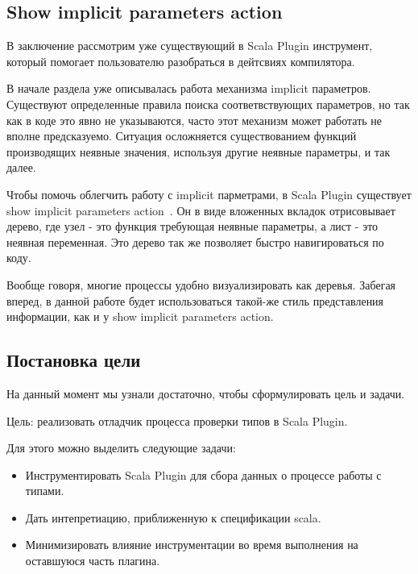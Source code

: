 
\subsection{Show implicit parameters action}
\label{sec:showImplicit}

В заключение рассмотрим уже существующий в Scala Plugin инструмент, который
помогает пользователю разобраться в дейтсвиях компилятора.

В начале раздела уже описывалась работа механизма implicit параметров.
Существуют определенные правила поиска соответвствующих параметров,
но так как в коде это явно не указываются, часто этот механизм
может работать не вполне предсказуемо.
Ситуация осложняется существованием функций производящих неявные значения,
используя другие неявные параметры, и так далее.

Чтобы помочь облегчить работу с implicit парметрами, в Scala Plugin существует
show implicit parameters action~\cite{show_implicit}.
Он в виде вложенных вкладок отрисовывает дерево, где узел - это функция требующая
неявные параметры, а лист - это неявная переменная.
Это дерево так же позволяет быстро навигироваться по коду.

Вообще говоря, многие процессы удобно визуализировать как деревья.
Забегая вперед, в данной работе будет использоваться такой-же стиль
представления информации, как и у show implicit parameters action.

\subsection{Постановка цели}

На данный момент мы узнали достаточно, чтобы сформулировать цель и задачи.

Цель:
реализовать отладчик процесса проверки типов в Scala Plugin.

Для этого можно выделить следующие задачи:
\begin{itemize}
  \item Инструментировать Scala Plugin для сбора данных о процессе работы с типами.
  \item Дать интепретиацию, приближенную к спецификации scala.
  \item Минимизировать влияние инструментации во время выполнения на оставшуюся
  часть плагина.
\end{itemize}

